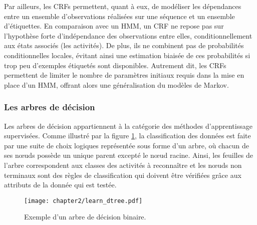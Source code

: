 Par ailleurs, les \acsp{CRF} permettent, quant à eux, de modéliser les dépendances entre un ensemble d'observations réalisées sur une séquence et un ensemble d'étiquettes. En comparaison avec un \acs{HMM}, un \acs{CRF} ne repose pas sur l'hypothèse forte d'indépendance des observations entre elles, conditionnellement aux états associés (les activités). De plus, ils ne combinent pas de probabilités conditionnelles locales, évitant ainsi une estimation biaisée de ces probabilités si trop peu d'exemples étiquetés sont disponibles. Autrement dit, les \acsp{CRF} permettent de limiter le nombre de paramètres initiaux requis dans la mise en place d'un \acs{HMM}, offrant alors une généralisation du modèles de Markov.

\subsubsection{Les arbres de décision}

Les arbres de décision appartiennent à la catégorie des méthodes d'apprentissage supervisées. Comme illustré par la figure \ref{fig:learn_dtree}, la classification des données est faite par une suite de choix logiques représentée sous forme d'un arbre, où chacun de ses n\oe{}uds possède un unique parent excepté le n\oe{}ud racine. Ainsi, les feuilles de l'arbre correspondent aux classes des activités à reconnaître et les n\oe{}uds non terminaux sont des règles de classification qui doivent être vérifiées grâce aux attributs de la donnée qui est testée.

\begin{figure}[H]
	\centering
	\texttt{[image: chapter2/learn\_dtree.pdf]}
	\caption{Exemple d'un arbre de décision binaire.}
	\label{fig:learn_dtree}
\end{figure}

